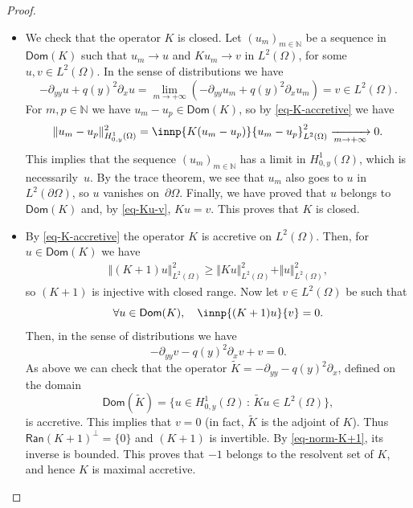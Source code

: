 \documentclass[JEP,XML,SOM,Unicode]{cedram}
\theoremstyle{plain}
\theoremstyle{definition}
\newcommand {\limt}[2]{\xrightarrow[#1 \to #2]{}}
\newcommand{\nr}[1]{\Vert #1\Vert}
\newcommand{\set}[1]{\{ #1\}}
\newcommand{\1}{\mathds 1}
\newcommand{\st}{\,:\,}
\let\Re\relax
\DeclareMathOperator{\Re}{\mathsf{Re}\mkern2mu}
\newcommand{\Dom}{\mathsf{Dom}}
\newcommand{\Ran}{\mathsf{Ran}}
\newcommand{\N}{\mathbb{N}}
\let\O\Omega
\begin{document}
\begin{proof}
\begin{itemize}
\item
We check that the operator $K$ is closed. Let $(u_m)_{m \in \N}$ be a sequence in $\Dom(K)$ such that $u_m \to u$ and $K u_m \to v$ in $L^2(\O)$, for some $u,v \in L^2(\O)$. In the sense of distributions we have
\begin{equation} \label{eq-Ku-v}
-\partial_{yy} u + q(y)^2 \partial_x u = \lim_{m \to +\infty} \left(-\partial_{yy} u_m + q(y)^2 \partial_x u_m \right) = v \in L^2(\O).
\end{equation}
For $m,p \in \N$ we have $u_m - u_p \in \Dom(K)$, so by \eqref{eq-K-accretive} we have
\begin{align*}
\nr{u_m - u_p}_{H^1_{0,y}(\O)}^2
= \Re \innp{K (u_m-u_p)}{u_m-u_p}_{L^2(\O)}^2
\limt m {+\infty} 0.
\end{align*}
This implies that the sequence $(u_m)_{m \in \N}$ has a limit in $H^1_{0,y}(\O)$, which is necessarily~$u$. By the trace theorem, we see that $u_m$ also goes to $u$ in $L^2(\partial\O)$, so $u$ vanishes on~$\partial \O$. Finally, we have proved that $u$ belongs to $\Dom(K)$ and, by \eqref{eq-Ku-v}, $Ku = v$. This proves that $K$ is closed.

\item
By \eqref{eq-K-accretive} the operator $K$ is accretive on $L^2(\O)$. Then, for $u \in \Dom(K)$ we have 
\begin{equation} \label{eq-norm-K+1}
\begin{aligned}
\nr{(K+1)u}_{L^2(\O)}^2 \geq \nr{Ku}_{L^2(\O)}^2 + \nr{u}_{L^2(\O)}^2,
\end{aligned}
\end{equation}
so $(K+1)$ is injective with closed range. Now let $v \in L^2(\O)$ be such that
\[
\forall u \in \Dom(K), \quad \innp{(K+1)u}{v} = 0.
\]
Then, in the sense of distributions we have
\[
-\partial_{yy} v - q(y)^2 \partial_x v + v = 0.
\]
As above we can check that the operator $\tilde K = -\partial_{yy} - q(y)^2 \partial_x$, defined on the domain
\[
\Dom(\tilde K) = \set{u \in H^1_{0,y}(\O) \st \tilde K u \in L^2(\O)},
\]
is accretive. This implies that $v = 0$ (in fact, $\tilde K$ is the adjoint of $K$). Thus \hbox{$\Ran(K+1)^\bot = \{0\}$} and $(K+1)$ is invertible. By \eqref{eq-norm-K+1}, its inverse is bounded. This proves that $-1$ belongs to the resolvent set of $K$, and hence $K$ is maximal accretive.\qedhere
\end{itemize}
\end{proof}
\end{document}
